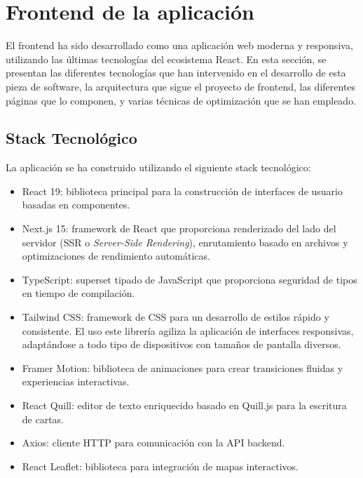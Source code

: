 \section{Frontend de la aplicación}

El frontend ha sido desarrollado como una aplicación web moderna y responsiva, utilizando las últimas tecnologías del ecosistema React. En esta sección, se presentan las diferentes tecnologías que han intervenido en el desarrollo de esta pieza de software, la arquitectura que sigue el proyecto de frontend, las diferentes páginas que lo componen, y varias técnicas de optimización que se han empleado.


\subsection{Stack Tecnológico}

La aplicación se ha construido utilizando el siguiente stack tecnológico:

\begin{itemize}
    \item React 19: biblioteca principal para la construcción de interfaces de usuario basadas en componentes.
    \item Next.js 15: framework de React que proporciona renderizado del lado del servidor (SSR o \textit{Server-Side Rendering}), enrutamiento basado en archivos y optimizaciones de rendimiento automáticas.
    \item TypeScript: superset tipado de JavaScript que proporciona seguridad de tipos en tiempo de compilación.
    \item Tailwind CSS: framework de CSS para un desarrollo de estilos rápido y consistente. El uso este librería agiliza la aplicación de interfaces responsivas, adaptándose a todo tipo de dispositivos con tamaños de pantalla diversos.
    \item Framer Motion: biblioteca de animaciones para crear transiciones fluidas y experiencias interactivas.\cite{framer_motion_docs}
    \item React Quill: editor de texto enriquecido basado en Quill.js para la escritura de cartas.\cite{quill_react_playground}
    \item Axios: cliente HTTP para comunicación con la API backend.
    \item React Leaflet: biblioteca para integración de mapas interactivos.\cite{react_leaflet_docs}
\end{itemize}

